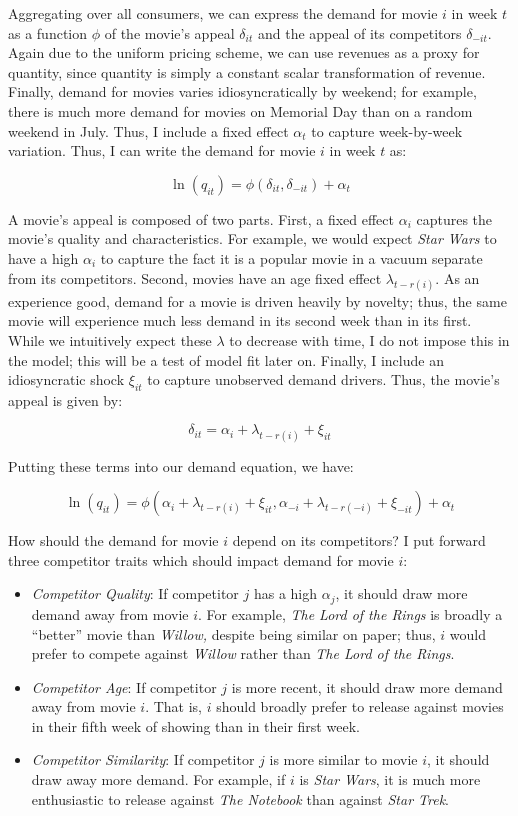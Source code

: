\documentclass{article}
\begin{document}
Aggregating over all consumers, we can express the demand for movie $i$ in week $t$ as a function $\phi$ of the movie's appeal $\delta_{it}$ and the appeal of its competitors $\delta_{-it}$. Again due to the uniform pricing scheme, we can use revenues as a proxy for quantity, since quantity is simply a constant scalar transformation of revenue. Finally, demand for movies varies idiosyncratically by weekend; for example, there is much more demand for movies on Memorial Day than on a random weekend in July. Thus, I include a fixed effect $\alpha_t$ to capture week-by-week variation. Thus, I can write the demand for movie $i$ in week $t$ as:

$$\ln(q_{it}) = \phi(\delta_{it}, \delta_{-it}) + \alpha_t$$

A movie's appeal is composed of two parts. First, a fixed effect $\alpha_i$ captures the movie's quality and characteristics. For example, we would expect \emph{Star Wars} to have a high $\alpha_i$ to capture the fact it is a popular movie in a vacuum separate from its competitors. Second, movies have an age fixed effect $\lambda_{t - r(i)}$. As an experience good, demand for a movie is driven heavily by novelty; thus, the same movie will experience much less demand in its second week than in its first. While we intuitively expect these $\lambda$ to decrease with time, I do not impose this in the model; this will be a test of model fit later on. Finally, I include an idiosyncratic shock $\xi_{it}$ to capture unobserved demand drivers. Thus, the movie's appeal is given by:

$$\delta_{it} = \alpha_i + \lambda_{t - r(i)} + \xi_{it}$$

Putting these terms into our demand equation, we have:

$$\ln(q_{it}) = \phi(\alpha_i + \lambda_{t - r(i)} + \xi_{it}, \alpha_{-i} + \lambda_{t - r(-i)} + \xi_{-it}) + \alpha_t$$

How should the demand for movie $i$ depend on its competitors? I put forward three competitor traits which should impact demand for movie $i$:
\begin{itemize}
    \item \emph{Competitor Quality}: If competitor $j$ has a high $\alpha_j$, it should draw more demand away from movie $i$. For example, \emph{The Lord of the Rings} is broadly a ``better'' movie than \emph{Willow,} despite being similar on paper; thus, $i$ would prefer to compete against \emph{Willow} rather than \emph{The Lord of the Rings}.
    \item \emph{Competitor Age}: If competitor $j$ is more recent, it should draw more demand away from movie $i$. That is, $i$ should broadly prefer to release against movies in their fifth week of showing than in their first week.
    \item \emph{Competitor Similarity}: If competitor $j$ is more similar to movie $i$, it should draw away more demand. For example, if $i$ is \emph{Star Wars}, it is much more enthusiastic to release against \emph{The Notebook} than against \emph{Star Trek}.
\end{itemize}
\end{document}
